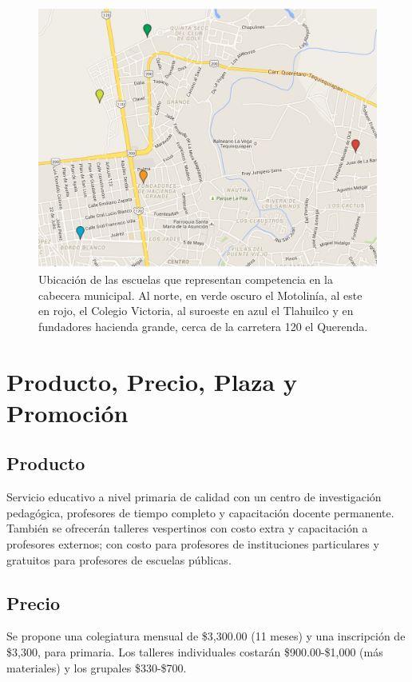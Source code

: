 \documentclass[10pt,letterpaper,oneside]{book}
\begin{document}
\begin{figure}[h]
\centering
\includegraphics[scale=0.6]{mapatequis.pdf}
\caption{Ubicación de las escuelas que representan competencia en la cabecera municipal. Al norte, en verde oscuro el Motolinía, al este en rojo, el Colegio Victoria, al suroeste en azul el Tlahuilco y en fundadores hacienda grande, cerca de la carretera 120 el Querenda.}
\end{figure}

\section{Producto, Precio, Plaza y Promoción}

\subsection{Producto}
Servicio educativo a nivel primaria de calidad con un centro de investigación pedagógica, profesores de tiempo completo y capacitación docente permanente. También se ofrecerán talleres vespertinos con costo extra y capacitación a profesores externos; con costo para profesores de instituciones particulares y gratuitos para profesores de escuelas públicas. 


\subsection{Precio}
Se propone una colegiatura mensual de \$3,300.00 (11 meses) y una inscripción de \$3,300, para primaria. Los talleres individuales costarán \$900.00-\$1,000 (más materiales) y los grupales \$330-\$700. 
\end{document}
